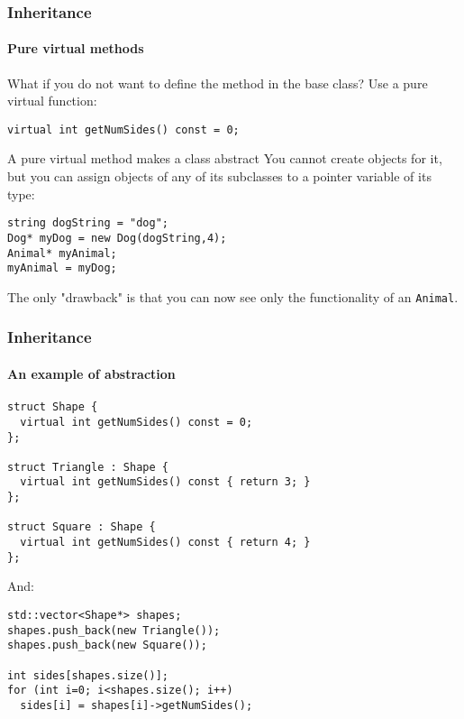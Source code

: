 \begin{frame}[fragile]
\frametitle{Inheritance}
\framesubtitle{Pure virtual methods}

\begin{block}{What if you do not want to define the method in the base class?}
Use a pure virtual function:

{\scriptsize 
\texttt{virtual int getNumSides() const = 0; }
}
\end{block}
\pause
\begin{block}{A pure virtual method makes a class abstract}
You cannot create objects for it, but you can assign objects of any of its subclasses to a pointer variable of its type:

{\scriptsize 
\begin{verbatim}
string dogString = "dog";
Dog* myDog = new Dog(dogString,4);
Animal* myAnimal;
myAnimal = myDog;
\end{verbatim}
}
The only "drawback" is that you can now see only the functionality of an \texttt{Animal}.
\end{block}

\end{frame}


\begin{frame}[fragile]
\frametitle{Inheritance}
\framesubtitle{An example of abstraction}
{\scriptsize 
\begin{verbatim}
struct Shape {
  virtual int getNumSides() const = 0;
};

struct Triangle : Shape {
  virtual int getNumSides() const { return 3; }
};

struct Square : Shape {
  virtual int getNumSides() const { return 4; }
};
\end{verbatim}
}
And:
{\scriptsize 
\begin{verbatim}
std::vector<Shape*> shapes;
shapes.push_back(new Triangle());
shapes.push_back(new Square());

int sides[shapes.size()];  
for (int i=0; i<shapes.size(); i++)
  sides[i] = shapes[i]->getNumSides();
\end{verbatim}
}
\end{frame}